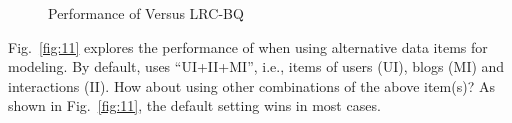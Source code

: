 \begin{figure}
  \centering
  \hspace{1in}
  \hspace{1in}
  \caption{Performance of \sys{} Versus LRC-BQ \tbc{}}
  \label{fig:10} 
\end{figure}


Fig.\ \ref{fig:11} explores the performance of \sys{} when using alternative data items for modeling.
By default, \sys{} uses ``UI+II+MI'', i.e., items of users (UI), blogs (MI) and interactions (II).
How about using other combinations of the above item(s)?
As shown in Fig.\ \ref{fig:11}, the default setting wins in most cases.

